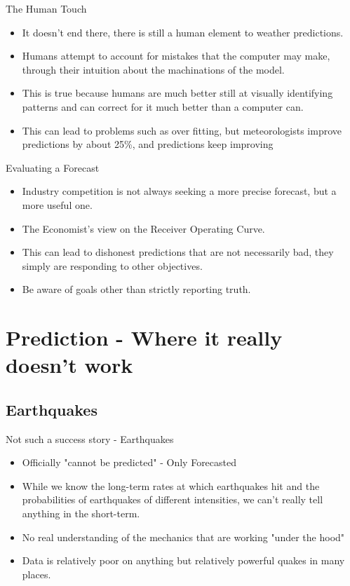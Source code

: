 \documentclass[bigger]{beamer}
\begin{document}
\begin{frame}[label=sec-2-4-4]{The Human Touch}
\begin{itemize}
\item It doesn't end there, there is still a human element to weather predictions.
\item Humans attempt to account for mistakes that the computer may make,
through their intuition about the machinations of the model.
\item This is true because humans are much better still at visually
identifying patterns and can correct for it much better than a
computer can.
\item This can lead to problems such as over fitting, but meteorologists
improve predictions by about 25\%, and predictions keep improving
\end{itemize}
\end{frame}

\begin{frame}[label=sec-2-4-5]{Evaluating a Forecast}
\begin{itemize}
\item Industry competition is not always seeking a more precise forecast,
but a more useful one.
\item The Economist's view on the Receiver Operating Curve.
\item This can lead to dishonest predictions that are not necessarily bad,
they simply are responding to other objectives.
\item Be aware of goals other than strictly reporting truth.
\end{itemize}
\end{frame}


\section{Prediction - Where it really doesn't work}
\label{sec-3}
\subsection{Earthquakes}
\label{sec-3-1}

\begin{frame}[label=sec-3-1-1]{Not such a success story - Earthquakes}
\begin{itemize}
\item Officially "cannot be predicted" - Only Forecasted
\item While we know the long-term rates at which earthquakes hit and the
probabilities of earthquakes of different intensities, we can't
really tell anything in the short-term.
\item No real understanding of the mechanics that are working "under the
hood"
\item Data is relatively poor on anything but relatively powerful quakes
in many places.
\end{itemize}
\end{frame}
\end{document}
